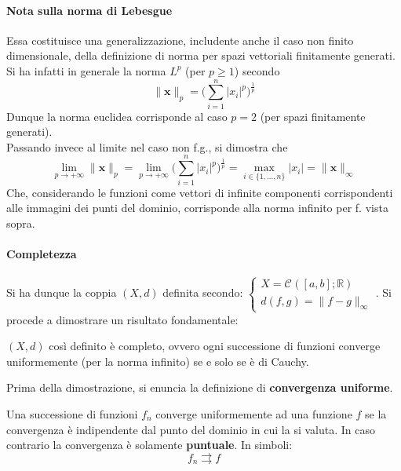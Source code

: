 \documentclass[10pt]{article}
\theoremstyle{plain}
\begin{document}
\paragraph{Nota sulla norma di Lebesgue} Essa costituisce una generalizzazione, includente anche il caso non finito dimensionale, della definizione di norma per spazi vettoriali finitamente generati. Si ha infatti in generale la norma $\mathit{L}^p$ (per $p \geq 1$) secondo
\[\|\mathbf{x}\|_{p} = \big(\sum\limits_{i=1}^n |x_i|^p\big)^{\frac{1}{p}}\]
Dunque la norma euclidea corrisponde al caso $p = 2$ (per spazi finitamente generati).
\\Passando invece al limite nel caso non f.g., si dimostra che 
\[\lim\limits_{p \rightarrow +\infty} \|\mathbf{x}\|_p = \lim\limits_{p \rightarrow +\infty}\big(\sum\limits_{i=1}^n |x_i|^p\big)^{\frac{1}{p}} = \max\limits_{i \in \{1, ..., n\}} |x_i| = \|\mathbf{x}\|_\infty\]
Che, considerando le funzioni come vettori di infinite componenti corrispondenti alle immagini dei punti del dominio, corrisponde alla norma infinito per f. vista sopra.

\paragraph{Completezza} Si ha dunque la coppia $(X,d)$ definita secondo: $\displaystyle \begin{cases}
X = \mathcal{C}^{}([a,b] ; \mathbb{R})\\
d(f,g) = \|f - g\|_\infty
\end{cases}$. Si procede a dimostrare un risultato fondamentale:

\begin{ther}
$(X,d)$ così definito è completo, ovvero ogni successione di funzioni converge uniformemente (per la norma infinito) se e solo se è di Cauchy.
\end{ther}
Prima della dimostrazione, si enuncia la definizione di \textbf{convergenza uniforme}.
\begin{defin}
	Una successione di funzioni $f_n$ converge uniformemente ad una funzione $f$ se la convergenza è indipendente dal punto del dominio in cui la si valuta. In caso contrario la convergenza è solamente \textbf{puntuale}. In simboli:
	\[f_n \rightrightarrows f\]
\end{defin}
\end{document}
